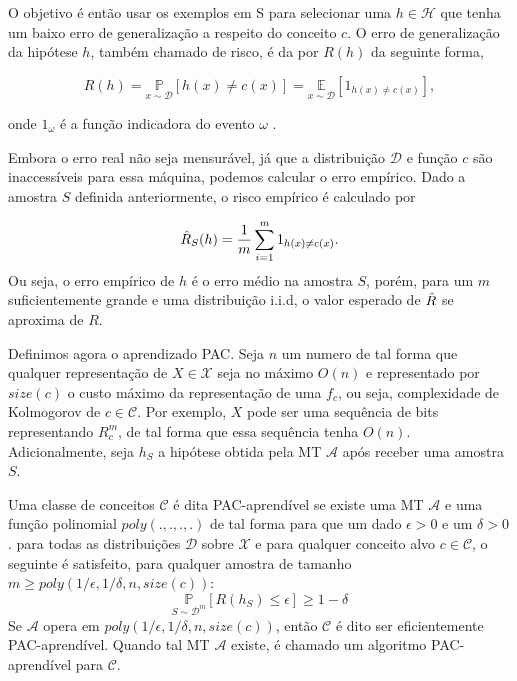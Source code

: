 O objetivo é então usar os exemplos em S para selecionar uma $h \in \mathcal{H}$
que tenha um baixo erro de generalização a respeito do conceito $c$. O erro de
generalização da hipótese $h$, também chamado de risco, é da por $R(h)$ da
seguinte forma,

\begin{equation}
    R(h) = \underset{x\sim\mathcal{D}}{\mathbb{P}}[h(x) \neq c(x)] = 
    \underset{x\sim\mathcal{D}}{\mathbb{E}}[1_{h(x) \neq c(x)}],
\end{equation}

onde $1_\omega$ é a função indicadora do evento $\omega$ \cite{mohri2018foundations}.

Embora o erro real não seja mensurável, já que a distribuição $\mathcal{D}$ e função
$c$ são inaccessíveis para essa máquina, podemos calcular o erro empírico. Dado a
amostra $S$ definida anteriormente, o risco empírico é calculado por 

\begin{equation}
    \Hat{R}_S(h) = \frac{1}{m} \sum_{i=1}^m 1_{h(x) \neq c(x)}.
\end{equation}
Ou seja, o erro empírico de $h$ é o erro médio na amostra $S$, porém, para um $m$
suficientemente grande e uma distribuição i.i.d, o valor esperado de $\Hat{R}$
se aproxima de $R$.

Definimos agora o aprendizado PAC. Seja $n$ um numero de tal forma que qualquer
representação de $X \in \mathcal{X}$ seja no máximo $O(n)$ e representado por
$size(c)$ o custo máximo da representação de uma $f_c$, ou seja, complexidade de
Kolmogorov de $c \in \mathcal{C}$. Por exemplo, $X$ pode ser uma sequência de bits
representando $R_c^m$, de tal forma que essa sequência tenha $O(n)$. Adicionalmente,
seja $h_S$ a hipótese obtida pela MT $\mathcal{A}$ após receber uma amostra $S$.

\begin{definition}
Uma classe de conceitos $\mathcal{C}$ é dita PAC-aprendível se existe uma MT $\mathcal{A}$
e uma função polinomial $poly(.,.,.,.)$ de tal forma para que um dado $\epsilon > 0$ e
um $\delta > 0$. para todas as distribuições $\mathcal{D}$ sobre $\mathcal{X}$ e para
qualquer conceito alvo $c \in \mathcal{C}$, o seguinte é satisfeito, para qualquer amostra
de tamanho $m \geq poly(1/\epsilon, 1/\delta, n, size(c))$: 
\begin{equation}
\underset{S\sim\mathcal{D}^m}{\mathbb{P}}[R(h_S)\leq\epsilon]\geq 1-\delta
\end{equation}
Se $\mathcal{A}$ opera em $poly(1/\epsilon, 1/\delta, n, size(c))$, então $\mathcal{C}$
é dito ser eficientemente PAC-aprendível. Quando tal MT $\mathcal{A}$ existe, é chamado um
algoritmo PAC-aprendível para $\mathcal{C}$.
\end{definition}

